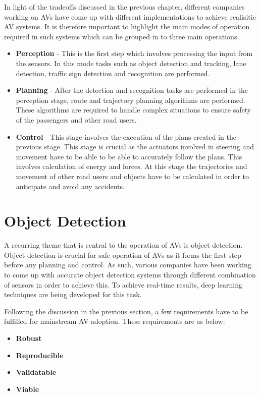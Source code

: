 In light of the tradeoffs discussed in the previous chapter, different companies working on AVs have come up with different implementations to achieve realisitic AV systems.
It is therefore important to highlight the main modes of operation required in such systems which can be grouped in to three main operations. 

\begin{itemize}
	\item \textbf{Perception} - This is the first step which involves processing the input from the sensors. In this mode tasks such as object detection and tracking, lane detection, traffic sign detection and recognition are performed.
	\item \textbf{Planning} - After the detection and recognition tasks are performed in the perception stage, route and trajectory planning algorithms are performed. These algorithms are required to handle complex situations to ensure safety of the passengers and other road users. 
	\item \textbf{Control} - This stage involves the execution of the plans created in the previous stage. This stage is crucial as the actuators involved in steering and movement have to be able to be able to accurately follow the plans. This involves calculation of energy and forces. At this stage the trajectories and movement of other road users and objects have to be calculated in order to anticipate and avoid any accidents. 
	
\end{itemize}


\section{Object Detection}
	
A recurring theme that is central to the operation of AVs is object detection. Object detection is crucial for safe operation of AVs as it forms the first step before any planning and control. As such, various companies have been working to come up with accurate object detection systems through different combination of sensors in order to achieve this. To achieve real-time results, deep learning techniques are being developed for this task. 

Following the discussion in the previous section, a few requirements have to be fulfilled for mainstream AV adoption. 
These requirements are as below:
\begin{itemize}
    \item \textbf{Robust}
    \item \textbf{Reproducible}
    \item \textbf{Validatable}
    \item \textbf{Viable}
\end{itemize}





